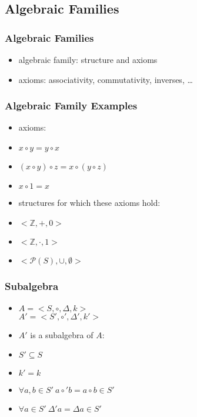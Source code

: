 \documentclass[dvipsnames]{beamer}
\begin{document}
\subsection{Algebraic Families}

\begin{frame}
  \frametitle{Algebraic Families}

  \begin{itemize}
    \item \alert{algebraic family}: structure and axioms
    \item axioms: associativity, commutativity, inverses, \ldots
  \end{itemize}
\end{frame}

\begin{frame}
  \frametitle{Algebraic Family Examples}

  \begin{itemize}
    \item axioms:
    \smallskip
    \item $x \circ y = y \circ x$
    \item $(x \circ y) \circ z = x \circ (y \circ z)$
    \item $x \circ 1 = x$

    \pause
    \medskip
    \item structures for which these axioms hold:
    \smallskip
    \item $<\mathbb{Z},+,0>$
    \item $<\mathbb{Z},\cdot,1>$
    \item $<\mathcal{P}(S),\cup,\emptyset>$
  \end{itemize}
\end{frame}

\begin{frame}
  \frametitle{Subalgebra}

  \begin{itemize}
    \item $A = <S,\circ,\Delta,k>$\\
      $A' = <S',\circ',\Delta',k'>$

    \medskip
    \item $A'$ is a \alert{subalgebra} of $A$:

    \pause
    \medskip
    \item $S' \subseteq S$
    \item $k' = k$
    \item $\forall a,b \in S'~a \circ' b = a \circ b \in S'$
    \item $\forall a \in S'~\Delta' a = \Delta a \in S'$
  \end{itemize}
\end{frame}
\end{document}
